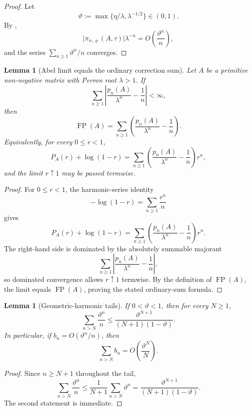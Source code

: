 \documentclass[11pt,a4paper]{amsart}
\theoremstyle{plain}
\newtheorem{lemma}[theorem]{Lemma}
\theoremstyle{definition}
\theoremstyle{remark}
\DeclareMathOperator{\FP}{FP}
\newcommand{\abs}[1]{\lvert #1 \rvert}
\begin{document}
\begin{proof}
  Let
  \[
    \vartheta:=\max\{\eta/\lambda,\lambda^{-1/2}\}\in(0,1).
  \]
  By ,
  \[
    \abs{\pi_{n,\varrho}(A,\tau)}\lambda^{-n}
    =O\!\left(\frac{\vartheta^n}{n}\right),
  \]
  and the series \(\sum_{n\ge 1}\vartheta^n/n\) converges.
\end{proof}

\begin{lemma}[Abel limit equals the ordinary correction sum]
  \label{lem:abel-correction-sum}
  Let \(A\) be a primitive non-negative matrix with Perron root
  \(\lambda>1\). If
  \[
    \sum_{n\ge 1}\left|\frac{p_n(A)}{\lambda^n}-\frac{1}{n}\right|
    <\infty,
  \]
  then
  \[
    \FP(A)
    =
    \sum_{n\ge 1}\left(\frac{p_n(A)}{\lambda^n}-\frac{1}{n}\right).
  \]
  Equivalently, for every \(0\le r<1\),
  \[
    P_A(r)+\log(1-r)
    =
    \sum_{n\ge 1}\left(\frac{p_n(A)}{\lambda^n}-\frac{1}{n}\right)r^n,
  \]
  and the limit \(r\uparrow 1\) may be passed termwise.
\end{lemma}

\begin{proof}
  For \(0\le r<1\), the harmonic-series identity
  \[
    -\log(1-r)=\sum_{n\ge 1}\frac{r^n}{n}
  \]
  gives
  \[
    P_A(r)+\log(1-r)
    =
    \sum_{n\ge 1}\left(\frac{p_n(A)}{\lambda^n}-\frac{1}{n}\right)r^n.
  \]
  The right-hand side is dominated by the absolutely summable majorant
  \[
    \sum_{n\ge 1}\left|\frac{p_n(A)}{\lambda^n}-\frac{1}{n}\right|,
  \]
  so dominated convergence allows \(r\uparrow 1\) termwise. By the
  definition of \(\FP(A)\), the limit equals \(\FP(A)\), proving the
  stated ordinary-sum formula.
\end{proof}

\begin{lemma}[Geometric-harmonic tails]
  \label{lem:geometric-harmonic-tail}
  If \(0<\vartheta<1\), then for every \(N\ge 1\),
  \[
    \sum_{n>N}\frac{\vartheta^n}{n}
    \le
    \frac{\vartheta^{N+1}}{(N+1)(1-\vartheta)}.
  \]
  In particular, if \(b_n=O(\vartheta^n/n)\), then
  \[
    \sum_{n>N}b_n=O\!\left(\frac{\vartheta^N}{N}\right).
  \]
\end{lemma}

\begin{proof}
  Since \(n\ge N+1\) throughout the tail,
  \[
    \sum_{n>N}\frac{\vartheta^n}{n}
    \le
    \frac{1}{N+1}\sum_{n>N}\vartheta^n
    =
    \frac{\vartheta^{N+1}}{(N+1)(1-\vartheta)}.
  \]
  The second statement is immediate.
\end{proof}
\end{document}
